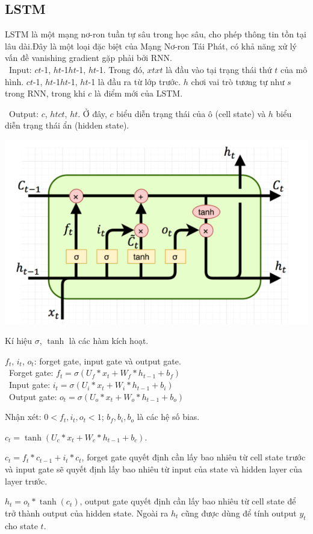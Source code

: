 \subsection{LSTM}
LSTM là một mạng nơ-ron tuần tự sâu trong học sâu, cho phép thông tin tồn tại lâu dài.Đây là một loại đặc biệt của Mạng Nơ-ron Tái Phát, có khả năng xử lý vấn đề vanishing gradient gặp phải bởi RNN.\\
\indent\textbullet\ Input: \(ct\)-1, \(ht\)-1\(ht\)-1, \(ht\)-1. Trong đó, \(xtxt\) là đầu vào tại trạng thái thứ \(t\) của mô hình. \(ct\)-1, \(ht\)-1\(ht\)-1, \(ht\)-1 là đầu ra từ lớp trước. \(h\) chơi vai trò tương tự như \(s\) trong RNN, trong khi \(c\) là điểm mới của LSTM.

\indent\textbullet\ Output: \(c\), \(htct\), \(ht\). Ở đây, \(c\) biểu diễn trạng thái của ô (cell state) và \(h\) biểu diễn trạng thái ẩn (hidden state).

\begin{minipage}{0.5\textwidth}
\centering
\includegraphics[width=1\textwidth]{resources/chapter-4/lstm-1.png}
\end{minipage}

Kí hiệu \(\sigma\), \(\tanh\) là các hàm kích hoạt.
\par
\( f_t \), \( i_t \), \( o_t \): forget gate, input gate và output gate.\\
    \indent\textbullet\ Forget gate: \( f_t = \sigma\left(U_f \ast x_t + W_f \ast h_{t-1} + b_f\right) \)\\
    \indent\textbullet\ Input gate: \( i_t = \sigma\left(U_i \ast x_t + W_i \ast h_{t-1} + b_i\right) \)\\
    \indent\textbullet\ Output gate: \( o_t = \sigma\left(U_o \ast x_t + W_o \ast h_{t-1} + b_o\right) \)
\par
Nhận xét: \( 0 < f_t, i_t, o_t < 1 \); \( b_f, b_i, b_o \) là các hệ số bias.
\par
\( c_t = \tanh\left(U_c \ast x_t + W_c \ast h_{t-1} + b_c\right) \).
\par
\( c_t = f_t \ast c_{t-1} + i_t \ast c_t \), forget gate quyết định cần lấy bao nhiêu từ cell state trước và input gate sẽ quyết định lấy bao nhiêu từ input của state và hidden layer của layer trước.
\par
\( h_t = o_t \ast \tanh\left(c_t\right) \), output gate quyết định cần lấy bao nhiêu từ cell state để trở thành output của hidden state. Ngoài ra \( h_t \) cũng được dùng để tính output \( y_t \) cho state \( t \).



